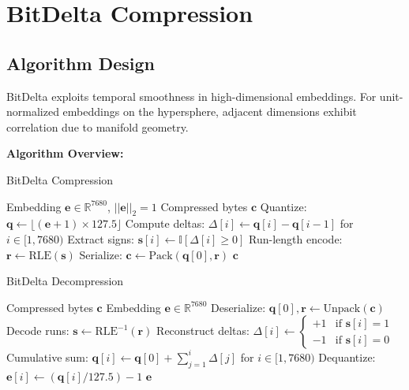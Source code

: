 \documentclass[11pt,a4paper]{article}
\begin{document}
\section{BitDelta Compression}

\subsection{Algorithm Design}

BitDelta exploits temporal smoothness in high-dimensional embeddings. For unit-normalized embeddings on the hypersphere, adjacent dimensions exhibit correlation due to manifold geometry.

\textbf{Algorithm Overview:}

\begin{algorithm}[H]
\caption{BitDelta Compression}
\label{alg:bitdelta-compress}
\begin{algorithmic}[1]
\REQUIRE Embedding $\mathbf{e} \in \mathbb{R}^{7680}$, $||\mathbf{e}||_2 = 1$
\ENSURE Compressed bytes $\mathbf{c}$
\STATE Quantize: $\mathbf{q} \gets \lfloor (\mathbf{e} + 1) \times 127.5 \rfloor$ 
\STATE Compute deltas: $\Delta[i] \gets \mathbf{q}[i] - \mathbf{q}[i-1]$ for $i \in [1, 7680)$
\STATE Extract signs: $\mathbf{s}[i] \gets \mathbb{I}[\Delta[i] \geq 0]$ 
\STATE Run-length encode: $\mathbf{r} \gets \text{RLE}(\mathbf{s})$
\STATE Serialize: $\mathbf{c} \gets \text{Pack}(\mathbf{q}[0], \mathbf{r})$
\RETURN $\mathbf{c}$
\end{algorithmic}
\end{algorithm}

\begin{algorithm}[H]
\caption{BitDelta Decompression}
\label{alg:bitdelta-decompress}
\begin{algorithmic}[1]
\REQUIRE Compressed bytes $\mathbf{c}$
\ENSURE Embedding $\mathbf{e} \in \mathbb{R}^{7680}$
\STATE Deserialize: $\mathbf{q}[0], \mathbf{r} \gets \text{Unpack}(\mathbf{c})$
\STATE Decode runs: $\mathbf{s} \gets \text{RLE}^{-1}(\mathbf{r})$
\STATE Reconstruct deltas: $\Delta[i] \gets \begin{cases} +1 & \text{if } \mathbf{s}[i] = 1 \\ -1 & \text{if } \mathbf{s}[i] = 0 \end{cases}$
\STATE Cumulative sum: $\mathbf{q}[i] \gets \mathbf{q}[0] + \sum_{j=1}^{i} \Delta[j]$ for $i \in [1, 7680)$
\STATE Dequantize: $\mathbf{e}[i] \gets (\mathbf{q}[i] / 127.5) - 1$
\RETURN $\mathbf{e}$
\end{algorithmic}
\end{algorithm}
\end{document}
